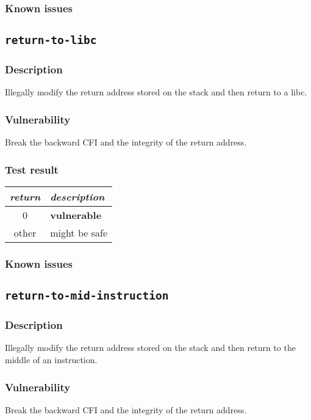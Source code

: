 \documentclass[a4paper]{book}
\begin{document}
\subsubsection{Known issues}
\newpage
\subsection{\texttt{return-to-libc}}\label{test-return-to-libc}

\subsubsection{Description}
Illegally modify the return address stored on the stack and then return to a libc.

\subsubsection{Vulnerability}
Break the backward CFI and the integrity of the return address.

\subsubsection{Test result}
\begin{tabular}{cl}
  \toprule
  \emph{return}  & \emph{description} \\
  \midrule
  0              & \textbf{vulnerable} \\
  other          & might be safe \\
  \bottomrule
\end{tabular}
  
\subsubsection{Known issues}

\newpage
\subsection{\texttt{return-to-mid-instruction}}\label{test-return-to-mid-instruction}

\subsubsection{Description}
Illegally modify the return address stored on the stack and then return to the middle of an instruction.

\subsubsection{Vulnerability}
Break the backward CFI and the integrity of the return address.
\end{document}
